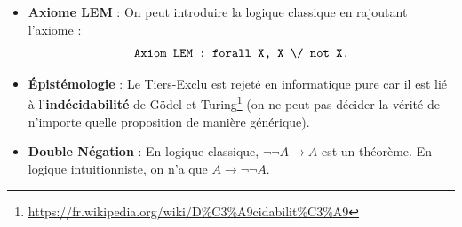 \documentclass[11pt,a4paper]{article}
\begin{document}
\begin{itemize}
  \item \textbf{Axiome LEM} : On peut introduire la logique classique en rajoutant l'axiome :
    \[
      \text{\texttt{Axiom LEM : forall X, X \textbackslash/ not X.}}
    \]
  \item \textbf{Épistémologie} : Le Tiers-Exclu est rejeté en informatique pure car il est lié à l'\textbf{indécidabilité} de Gödel et Turing\footnote{\url{https://fr.wikipedia.org/wiki/D\%C3\%A9cidabilit\%C3\%A9}} (on ne peut pas décider la vérité de n'importe quelle proposition de manière générique).
  \item \textbf{Double Négation} : En logique classique, $\neg\neg A \to A$ est un théorème. En logique intuitionniste, on n'a que $A \to \neg\neg A$.
\end{itemize}
\end{document}
